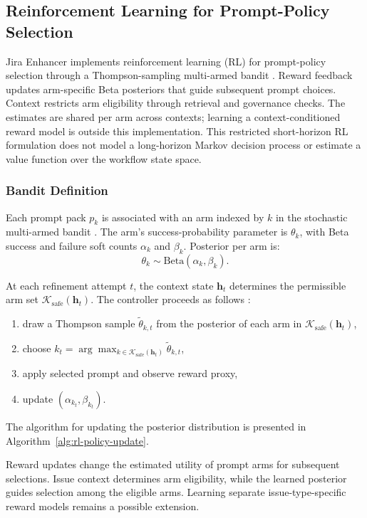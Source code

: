\documentclass[pdflatex,sn-basic]{sn-jnl}
\begin{document}
\subsection{Reinforcement Learning for Prompt-Policy Selection}

Jira Enhancer implements reinforcement learning (RL) for prompt-policy selection through a Thompson-sampling multi-armed bandit \citep{R100}. Reward feedback updates arm-specific Beta posteriors that guide subsequent prompt choices. Context restricts arm eligibility through retrieval and governance checks. The estimates are shared per arm across contexts; learning a context-conditioned reward model \citep{R86} is outside this implementation. This restricted short-horizon RL formulation does not model a long-horizon Markov decision process or estimate a value function over the workflow state space.

\subsubsection{Bandit Definition}
Each prompt pack $p_k$ is associated with an arm indexed by $k$ in the stochastic multi-armed bandit \citep{R84}. The arm's success-probability parameter is $\theta_k$, with Beta success and failure soft counts $\alpha_k$ and $\beta_k$. Posterior per arm is:
\begin{equation}
\theta_k \sim \text{Beta}(\alpha_k, \beta_k).
\end{equation}

At each refinement attempt $t$, the context state $\mathbf{h}_t$ determines the permissible arm set $\mathcal{K}_{\mathrm{safe}}(\mathbf{h}_t)$. The controller proceeds as follows \citep{R85}:
\begin{enumerate}
  \item draw a Thompson sample $\widetilde{\theta}_{k,t}$ from the posterior of each arm in $\mathcal{K}_{\mathrm{safe}}(\mathbf{h}_t)$,
  \item choose $k_t = \arg\max_{k\in\mathcal{K}_{\mathrm{safe}}(\mathbf{h}_t)} \widetilde{\theta}_{k,t}$,
  \item apply selected prompt and observe reward proxy,
  \item update $(\alpha_{k_t},\beta_{k_t})$.
\end{enumerate}
The algorithm for updating the posterior distribution is presented in Algorithm~\ref{alg:rl-policy-update}.

Reward updates change the estimated utility of prompt arms for subsequent selections. Issue context determines arm eligibility, while the learned posterior guides selection among the eligible arms. Learning separate issue-type-specific reward models remains a possible extension.
\end{document}
